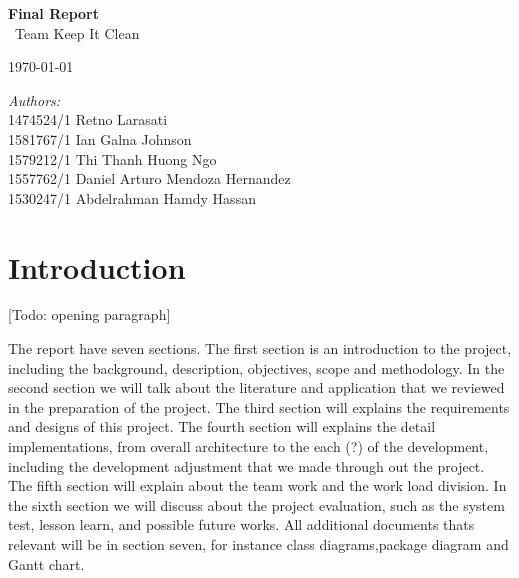 \documentclass[11pt]{article}
\begin{document}
	\begin{titlepage}
	\center
	\newcommand{\HRule}{\rule{\linewidth}{0.5mm}} 

        {\huge \bfseries Final Report}\\[0.4cm]
        	\ Team Keep It Clean
        
        {\large \today}\\[10cm] 
        
        \begin{minipage}{0.4\textwidth}
        		\emph{Authors:}\\
        			1474524/1	Retno Larasati\\
                    1581767/1	Ian Galna Johnson\\	
                    1579212/1	Thi Thanh Huong Ngo\\
                    1557762/1	Daniel Arturo Mendoza Hernandez\\
                    1530247/1	Abdelrahman Hamdy Hassan\\
        \end{minipage}

\end{titlepage}
\tableofcontents
\newpage
	
\section{Introduction}


[Todo: opening paragraph]

The report have seven sections. The first section is an introduction to the project, including the background, description, objectives, scope and methodology. In the second section we will talk about the literature and application that we reviewed in the preparation of the project. The third section will explains the requirements and designs of this project. The fourth section will explains the detail implementations, from overall architecture to the each (?) of the development, including the development adjustment that we made through out the project. The fifth section will explain about the team work and the work load division. In the sixth section we will discuss about the project evaluation, such as the system test, lesson learn, and possible future works. All additional documents thats relevant will be in section seven, for instance class diagrams,package diagram and Gantt chart.
\end{document}

